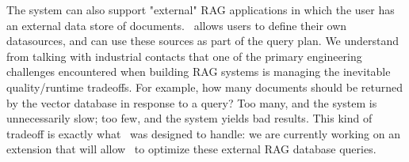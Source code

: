 The system can also support "external" RAG applications in which the user has an external data store of documents. \system\ allows users to define their own datasources, and can use these sources as part of the query plan. We understand from talking with industrial contacts that one of the primary engineering challenges encountered when building RAG systems is managing the inevitable quality/runtime tradeoffs. For example, how many 
documents should be returned by the vector database in response to a query? Too many, and the system is unnecessarily slow; too few, and the system yields bad results. This kind of tradeoff is exactly what \system\ was designed to handle: we are currently working on an extension that will allow \system\ to optimize these external RAG database queries.





